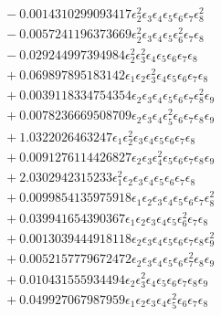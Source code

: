 \documentclass[10pt]{article}
\begin{document}
\begin{align*}
&{}  - 0.0014310299093417 \epsilon_{2}^{2} \epsilon_{3} \epsilon_{4} \epsilon_{5} \epsilon_{6} \epsilon_{7} \epsilon_{8}^{2} \\
&{}  - 0.0057241196373669 \epsilon_{2}^{2} \epsilon_{3} \epsilon_{4} \epsilon_{5} \epsilon_{6}^{2} \epsilon_{7} \epsilon_{8} \\
&{}  - 0.029244997394984 \epsilon_{2}^{2} \epsilon_{3}^{2} \epsilon_{4} \epsilon_{5} \epsilon_{6} \epsilon_{7} \epsilon_{8} \\
&{}  + 0.069897895183142 \epsilon_{1} \epsilon_{2} \epsilon_{3}^{2} \epsilon_{4} \epsilon_{5} \epsilon_{6} \epsilon_{7} \epsilon_{8} \\
&{}  + 0.0039118334754354 \epsilon_{2} \epsilon_{3} \epsilon_{4} \epsilon_{5} \epsilon_{6} \epsilon_{7} \epsilon_{8}^{2} \epsilon_{9} \\
&{}  + 0.0078236669508709 \epsilon_{2} \epsilon_{3} \epsilon_{4} \epsilon_{5}^{2} \epsilon_{6} \epsilon_{7} \epsilon_{8} \epsilon_{9} \\
&{}  + 1.0322026463247 \epsilon_{1} \epsilon_{2}^{2} \epsilon_{3} \epsilon_{4} \epsilon_{5} \epsilon_{6} \epsilon_{7} \epsilon_{8} \\
&{}  + 0.0091276114426827 \epsilon_{2} \epsilon_{3} \epsilon_{4}^{2} \epsilon_{5} \epsilon_{6} \epsilon_{7} \epsilon_{8} \epsilon_{9} \\
&{}  + 2.0302942315233 \epsilon_{1}^{2} \epsilon_{2} \epsilon_{3} \epsilon_{4} \epsilon_{5} \epsilon_{6} \epsilon_{7} \epsilon_{8} \\
&{}  + 0.0099854135975918 \epsilon_{1} \epsilon_{2} \epsilon_{3} \epsilon_{4} \epsilon_{5} \epsilon_{6} \epsilon_{7} \epsilon_{8}^{2} \\
&{}  + 0.039941654390367 \epsilon_{1} \epsilon_{2} \epsilon_{3} \epsilon_{4} \epsilon_{5} \epsilon_{6}^{2} \epsilon_{7} \epsilon_{8} \\
&{}  + 0.0013039444918118 \epsilon_{2} \epsilon_{3} \epsilon_{4} \epsilon_{5} \epsilon_{6} \epsilon_{7} \epsilon_{8} \epsilon_{9}^{2} \\
&{}  + 0.0052157779672472 \epsilon_{2} \epsilon_{3} \epsilon_{4} \epsilon_{5} \epsilon_{6} \epsilon_{7}^{2} \epsilon_{8} \epsilon_{9} \\
&{}  + 0.010431555934494 \epsilon_{2} \epsilon_{3}^{2} \epsilon_{4} \epsilon_{5} \epsilon_{6} \epsilon_{7} \epsilon_{8} \epsilon_{9} \\
&{}  + 0.049927067987959 \epsilon_{1} \epsilon_{2} \epsilon_{3} \epsilon_{4} \epsilon_{5}^{2} \epsilon_{6} \epsilon_{7} \epsilon_{8} \\

\end{align*}
\end{document}
